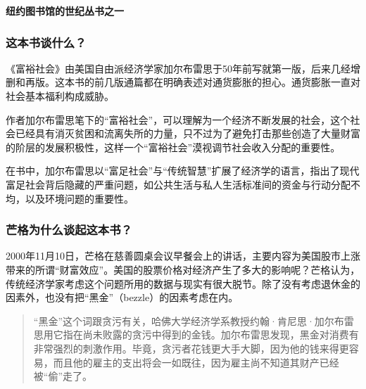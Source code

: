 \cleardoublepage
{}


\begin{BookSummaryBox}
\textbf{纽约图书馆的世纪丛书之一}
\par
\end{BookSummaryBox}

\subsubsection*{这本书谈什么？}

《富裕社会》由美国自由派经济学家加尔布雷思于50年前写就第一版，后来几经增删和再版。这本书的前几版通篇都在明确表述对通货膨胀的担心。通货膨胀一直对社会基本福利构成威胁。
\par

作者加尔布雷思笔下的“富裕社会”，可以理解为一个经济不断发展的社会，这个社会已经具有消灭贫困和流离失所的力量，只不过为了避免打击那些创造了大量财富的阶层的发展积极性，这样一个“富裕社会”漠视调节社会收入分配的重要性。
\par

在书中，加尔布雷思以“富足社会”与“传统智慧”扩展了经济学的语言，指出了现代富足社会背后隐藏的严重问题，如公共生活与私人生活标准间的资金与行动分配不均，以及环境问题的重要性。
\par

\subsubsection*{芒格为什么谈起这本书？}

2000年11月10日，芒格在慈善圆桌会议早餐会上的讲话，主要内容为美国股市上涨带来的所谓“财富效应”。美国的股票价格对经济产生了多大的影响呢？芒格认为，传统经济学家考虑这个问题所用的数据与现实有很大脱节。除了没有考虑退休金的因素外，也没有把“黑金”（bezzle）的因素考虑在内。
\par

\begin{quotation}
“黑金”这个词跟贪污有关，哈佛大学经济学系教授约翰·肯尼思·加尔布雷思用它指在尚未败露的贪污中得到的金钱。加尔布雷思发现，黑金对消费有非常强烈的刺激作用。毕竟，贪污者花钱更大手大脚，因为他的钱来得更容易，而且他的雇主的支出将会一如既往，因为雇主尚不知道其财产已经被“偷”走了。
\par
\end{quotation}

